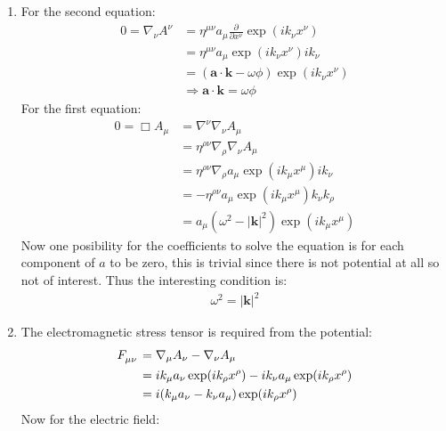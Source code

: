 \documentclass[12pt,a4]{article}
\begin{document}
\begin{enumerate}
\begin{enumerate}
      \item
        For the second equation:
        \begin{align*}
          0 = \nabla_\nu A^\nu &= \eta^{\mu\nu} a_\mu\frac{\partial}{\partial x^{\nu}} \exp(ik_\nu x^\nu)\\
                           &= \eta^{\mu\nu} a_\mu \exp(ik_\nu x^\nu)i k_\nu\\
                           &= (\mathbf{a} \cdot \mathbf{k} - \omega \phi) \exp(ik_\nu x^\nu)\\
                           &\Rightarrow \mathbf{a} \cdot \mathbf{k} = \omega \phi
        \end{align*}
        For the first equation:
        \begin{align*}
          0 = \Box A_\mu  &= \nabla^\nu \nabla_\nu A_\mu\\
                          &= \eta^{\rho\nu}\nabla_\rho \nabla_\nu A_\mu\\
                          &= \eta^{\rho\nu}\nabla_\rho a_\mu \exp(ik_\mu x^\mu) i k_\nu \\
                          &= - \eta^{\rho\nu} a_\mu \exp(ik_\mu x^\mu) k_\nu k_\rho \\
                          &= a_\mu (\omega^2 - |\mathbf{k}|^2)\exp(ik_\mu x^\mu)
        \end{align*}
        Now one posibility for the coefficients to solve the equation is for each component of $a$ to be zero, this is trivial since there is not potential at all so not of interest.
        Thus the interesting condition is:
        \begin{align*}
          \omega^2 = |\mathbf{k}|^2
        \end{align*}
      \item
        The electromagnetic stress tensor is required from the potential:
        \begin{align*}
          \tensor{F}{_\mu_\nu} &= \nabla_\mu A_\nu - \nabla_\nu A_\mu\\
                               &= ik_\mu a_\nu \exp(ik_\rho x^\rho) - ik_\nu a_\mu\exp(ik_\rho x^\rho)\\
                               &= i(k_\mu a_\nu - k_\nu a_\mu) \exp(ik_\rho x^\rho)
        \end{align*}
        Now for the electric field:

\end{enumerate}
\end{enumerate}
\end{document}
